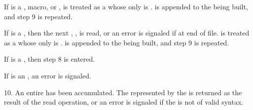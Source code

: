 \beginlist
\itemitem{\bull}
If  is a , macro, or  ,
 is treated as a  
whose only  is .             
 is appended to the  being built, and step 9 is repeated.

\itemitem{\bull}
If  is a  , then the next ,
, is read, or an error  is signaled if at end of file.
 is treated as a 
whose only  is .
 is appended to the  being built,
and step 9 is repeated.

\itemitem{\bull}
If  is a  ,
then step 8 is entered.

\itemitem{\bull}
If  is an  ,
an error  is signaled.
\endlist

\item{10.}
An entire  has been accumulated.
The  represented by the  is returned 
as the result of the read operation,
or an error  is signaled if the  is not of valid syntax.
\endlist




